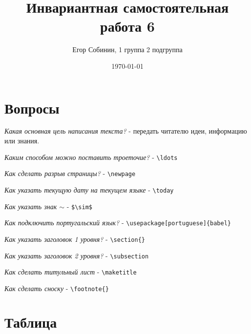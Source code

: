 \documentclass[a4paper,12pt]{article} %
\author{Егор Собинин, 1 группа 2 подгруппа}
\title{Инвариантная самостоятельная работа 6}
\date{\today}
\begin{document}
\maketitle
\newpage
\section{Вопросы}

\hspace{5mm}\emph{Какая основная цель написания текста?} - передать читателю идеи, информацию или знания.

\emph{Каким способом можно поставить троеточие?} - \verb|\ldots|

\emph{Как сделать разрыв страницы?} - \verb|\newpage|

\emph{Как указать текущую дату на текущем языке} - \verb|\today|

\emph{Как указать знак $\sim$} - \verb|$\sim$|

\emph{Как подключить португальский язык?} - \verb|\usepackage[portuguese]{babel}|

\emph{Как указать заголовок 1 уровня?} - \verb|\section{}|

\emph{Как указать заголовок 2 уровня?} - \verb|\subsection|

\emph{Как сделать титульный лист} - \verb|\maketitle|

\emph{Как сделать сноску} - \verb|\footnote{}|

\section{Таблица}
\end{document}
